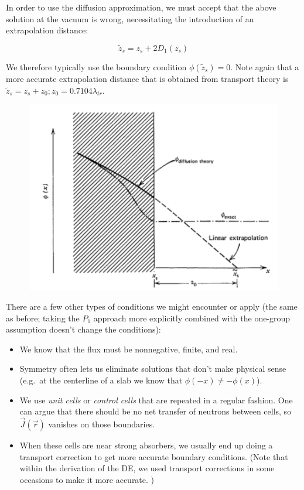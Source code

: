 \documentclass[12pt]{article}
\newcommand{\rvec}{\ensuremath{\vec{r}}}
\begin{document}
In order to use the diffusion approximation, we must accept that the above solution at the vacuum is wrong, necessitating the introduction of an extrapolation distance:

\begin{equation*}
\tilde{z}_s = z_s + 2D_1(z_s)
\end{equation*}

We therefore typically use the boundary condition $\phi(\tilde{z}_s) = 0$. 
Note again that a more accurate extrapolation distance that is obtained from transport theory is $\tilde{z}_s = z_s + z_0; z_0 = 0.7104 \lambda_{tr}$.

\begin{figure}
    \begin{center}
    \includegraphics[keepaspectratio, width = 3 in]{../figs/extrapolation}
    \end{center}
    \label{fig:phase_space}
\end{figure}

There are a few other types of conditions we might encounter or apply (the same as before; taking the $P_1$ approach more explicitly combined with the one-group assumption doesn't change the conditions):
\begin{itemize}
\item We know that the flux must be nonnegative, finite, and real. 
\item Symmetry often lets us eliminate solutions that don't make physical sense (e.g.\ at the centerline of a slab we know that $\phi(-x) \neq - \phi(x)$). 
\item We use \textit{unit cells} or \textit{control cells} that are repeated in a regular fashion. 
One can argue that there should be no net transfer of neutrons between cells, so $\vec{J}(\rvec)$ vanishes on those boundaries.
\item When these cells are near strong absorbers, we usually end up doing a transport correction to get more accurate boundary conditions. 
(Note that within the derivation of the DE, we used transport corrections in some occasions to make it more accurate. )
\end{itemize}
\end{document}
